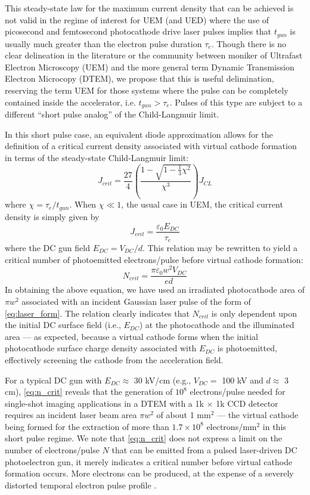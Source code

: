 This steady-state law for the maximum current density that can be achieved is not valid in the regime of interest for UEM (and UED) where the use of picosecond and femtosecond photocathode drive laser pulses implies that $t_{gun}$ is usually much greater than the electron pulse duration $\tau_e$.
Though there is no clear delineation in the literature or the community between moniker of Ultrafast Electron Microscopy (UEM) and the more general term Dynamic Transmission Electron Microcopy (DTEM), we propose that this is useful delimination, reserving the term UEM for those systems where the pulse can be completely contained inside the accelerator, i.e. $t_{gun} > \tau_e$.
Pulses of this type are subject to a different ``short pulse analog'' of the Child-Langmuir limit.

In this short pulse case, an equivalent diode approximation \cite{valfells_effects_2002} allows for the definition of a critical current density associated with virtual cathode formation in terms of the steady-state Child-Langmuir limit:
\begin{equation}
  J_{crit} = \frac{27}{4} \left ( \frac{ 1 - \sqrt{1-\tfrac{1}{3} \chi^2} }{ \chi^3 } \right ) J_{CL}
\end{equation}
where $\chi = \tau_e / t_{gun}$.
When $\chi \ll 1$, the usual case in UEM, the critical current density is simply given by
\begin{equation}
  J_{crit} = \frac{\varepsilon_0 E_{DC}}{\tau_e}
\end{equation}
where the DC gun field $E_{DC} = V_{DC}/d$.
This relation may be rewritten to yield a critical number of photoemitted electrons/pulse before virtual cathode formation:
\begin{equation} \label{eq:n_crit}
  N_{crit} = \frac{\pi \varepsilon_0 w^2 V_{DC}}{e d}
\end{equation}
In obtaining the above equation, we have used an irradiated photocathode area of $\pi w^2$ associated with an incident Gaussian laser pulse of the form of \ref{eq:laser_form}.
The relation clearly indicates that $N_{crit}$ is only dependent upon the initial DC surface field (i.e., $E_{DC}$) at the photocathode and the illuminated area --- as expected, because a virtual cathode forms when the initial photocathode surface charge density associated with $E_{DC}$ is photoemitted, effectively screening the cathode from the acceleration field.

For a typical DC gun with $E_{DC} \approx $ 30 kV/cm (e.g., $V_{DC} = $ 100 kV and $d \approx $ 3 cm), \ref{eq:n_crit} reveals that the generation of $10^8$ electrons/pulse needed for single-shot imaging applications in a DTEM with a 1k $\times$ 1k CCD detector requires an incident laser beam area $\pi w^2$ of about 1 mm$^2$ --- the virtual cathode being formed for the extraction of more than $1.7 \times 10^8$ electrons/mm$^2$ in this short pulse regime.
We note that \ref{eq:n_crit} does not express a limit on the number of electrons/pulse $N$ that can be emitted from a pulsed laser-driven DC photoelectron gun, it merely indicates a critical number before virtual cathode formation occurs.
More electrons can be produced, at the expense of a severely distorted temporal electron pulse profile \cite{valfells_effects_2002}.

